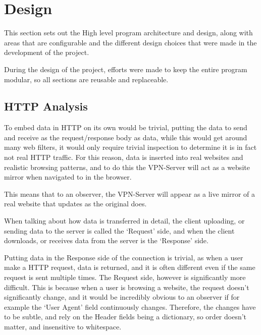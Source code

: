 \section{Design}
This section sets out the High level program architecture and design, along with areas that are configurable and the different design choices that were made in the development of the project.

During the design of the project, efforts were made to keep the entire program modular, so all sections are reusable and replaceable.
\subsection{HTTP Analysis}
To embed data in HTTP on its own would be trivial, putting the data to send and receive as the request/response body as data, while this would get around many web filters, it would only require trivial inspection to determine it is in fact not real HTTP traffic.
For this reason, data is inserted into real websites and realistic browsing patterns, and to do this the VPN-Server will act as a website mirror when navigated to in the browser.

This means that to an observer, the VPN-Server will appear as a live mirror of a real website that updates as the original does.

When talking about how data is transferred in detail, the client uploading, or sending data to the server is called the `Request' side, and when the client downloads, or receives data from the server is the `Response' side.

Putting data in the Response side of the connection is trivial, as when a user make a HTTP request, data is returned, and it is often different even if the same request is sent multiple times.
The Request side, however is significantly more difficult. This is because when a user is browsing a website, the request doesn't significantly change, and it would be incredibly obvious to an observer if for example the `User Agent' field continuously changes. Therefore, the changes have to be subtle, and rely on the Header fields being a dictionary, so order doesn't matter, and insensitive to whitespace.

\newpage
